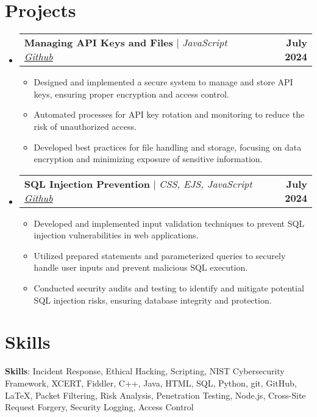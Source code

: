 \documentclass[letterpaper,11pt]{article}
\makeatletter
\newcommand{\resumeItem}[1]{
  \item\small{
    {#1 \vspace{-2pt}}
  }
}
\newcommand{\resumeProjectHeading}[2]{
    \item
    \begin{tabular*}{1.001\textwidth}{l@{\extracolsep{\fill}}r}
      \small#1 & \textbf{\small #2}\\
    \end{tabular*}\vspace{-7pt}
}
\newcommand{\resumeSubHeadingListStart}{\begin{itemize}[leftmargin=0.0in, label={}]}
\newcommand{\resumeSubHeadingListEnd}{\end{itemize}}
\newcommand{\resumeItemListStart}{\begin{itemize}}
\newcommand{\resumeItemListEnd}{\end{itemize}\vspace{-5pt}}
\makeatother
\begin{document}
\section{Projects}
    \vspace{-6pt}
    \resumeSubHeadingListStart
    \resumeProjectHeading
          {\textbf{Managing API Keys and Files} $|$ \emph{JavaScript \href{https://github.com/RaineJohnson/Node-Env-Keys-Management}{Github}}}{July 2024}
          \resumeItemListStart
            \resumeItem{Designed and implemented a secure system to manage and store API keys, ensuring proper encryption and access control.}
            \resumeItem{Automated processes for API key rotation and monitoring to reduce the risk of unauthorized access.}
            \resumeItem{Developed best practices for file handling and storage, focusing on data encryption and minimizing exposure of sensitive information.}
          \resumeItemListEnd
          \vspace{-14pt}

    \resumeProjectHeading
          {\textbf{SQL Injection Prevention} $|$ \emph{CSS, EJS, JavaScript \href{https://github.com/RaineJohnson/SQL-Injection-Project}{Github}}}{July 2024}
          \resumeItemListStart
            \resumeItem{Developed and implemented input validation techniques to prevent SQL injection vulnerabilities in web applications.}
            \resumeItem{Utilized prepared statements and parameterized queries to securely handle user inputs and prevent malicious SQL execution.}
            \resumeItem{Conducted security audits and testing to identify and mitigate potential SQL injection risks, ensuring database integrity and protection.}
          \resumeItemListEnd
          \vspace{-14pt}
    \resumeSubHeadingListEnd
\vspace{-3pt}

\section{Skills}
 \begin{itemize}[leftmargin=0.1in, label={}]
    \small{\item{
     \textbf{Skills}{: Incident Response, Ethical Hacking, Scripting, NIST Cybersecurity Framework, XCERT, Fiddler, C++, Java, HTML, SQL, Python, git, GitHub, LaTeX, Packet Filtering, Risk Analysis, Penetration Testing, Node.js, Cross-Site Request Forgery, Security Logging, Access Control} \\
     
    }}
 \end{itemize}
 \vspace{-20pt}
\end{document}
